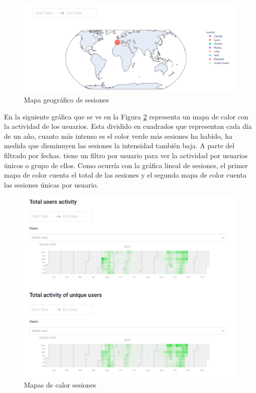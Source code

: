 \begin{figure}[H]
    \centering
    \includegraphics[width=17cm, keepaspectratio]{img/mundo.png}
    \caption{Mapa geográfico de sesiones}
    \label{fig:mundo}
\end{figure}
\newpage
En la siguiente gráfica que se ve en la Figura \ref{fig:activity} representa un mapa de calor con la actividad de los usuarios. Esta dividido en cuadrados que representan cada día de un año, cuanto más intenso es el color verde más sesiones ha habido, ha medida que disminuyen las sesiones la intensidad también baja. A parte del filtrado por fechas. tiene un filtro por usuario para ver la actividad por usuarios únicos o grupo de ellos. Como ocurría con la gráfica lineal de sesiones, el primer mapa de color cuenta el total de las sesiones y el segundo mapa de color cuenta las sesiones únicas por usuario.


\begin{figure}[H]
    \centering
    \includegraphics[width=17cm, keepaspectratio]{img/activity.png}
    \caption{Mapas de calor sesiones}
    \label{fig:activity}
\end{figure}
\newpage

